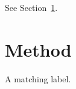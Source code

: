 \documentclass{article}
\begin{document}
See Section~\ref{sec:method}.\section{Method}\label{sec:method}A matching label.
\end{document}
